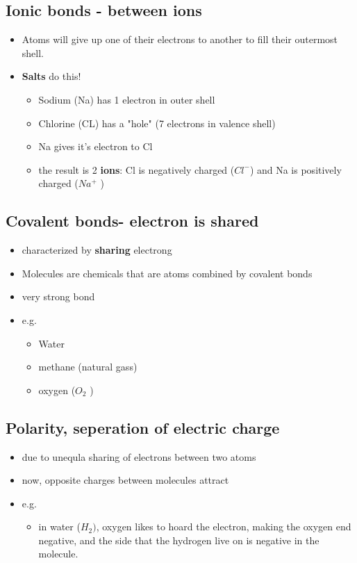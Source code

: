 \documentclass{article}
\theoremstyle{definition}
\begin{document}
\subsection{Ionic bonds - between ions}
\begin{itemize}
	\item Atoms will give up one of their electrons to another to fill their outermost shell. 
	\item \textbf{Salts} do this!
		\begin{itemize}
			\item Sodium (Na) has 1 electron in outer shell
			\item Chlorine (CL) has a "hole" (7 electrons in valence shell)
			\item Na gives it's electron to Cl
			\item the result is 2 \textbf{ions}: Cl is negatively charged ($Cl^-$) and Na is positively charged ($Na^+$ )
		\end{itemize}
\end{itemize}
\subsection{Covalent bonds- electron is shared}
\begin{itemize}
	\item characterized by \textbf{sharing}  electrong
	\item Molecules are chemicals that are atoms combined by covalent bonds
	\item very strong bond
	\item e.g.
		\begin{itemize}
			\item Water
			\item methane (natural gass)
			\item oxygen ($O_2$ )
		\end{itemize}
\end{itemize}

\subsection{Polarity, seperation of electric charge}
\begin{itemize}
	\item due to unequla sharing of electrons between two atoms
	\item now, opposite charges between molecules attract
	\item e.g.
		\begin{itemize}
			\item in water ($H_2 )$, oxygen likes to hoard the electron, making the oxygen end negative, and the side that the hydrogen live on is negative in the molecule.
		\end{itemize}
\end{itemize}
\end{document}
